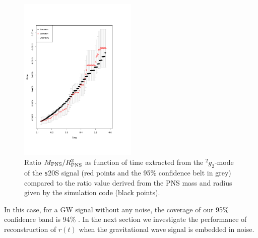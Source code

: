\begin{figure}
 \centering
 \includegraphics[width=0.5\textwidth,height=0.3\textheight]{plots/ratio}
 \caption{Ratio $M_{\rm PNS}/R_{\rm PNS}^2$ as function of time extracted from the $\mbox{}^2 g_2$-mode of the {\texttt s20S} signal (red points and the 95\% confidence belt in grey) compared to the ratio value derived from the PNS mass and radius given by the simulation code (black points).} \label{fig:ratio}
\end{figure}


In this case, for a GW signal without any noise, the coverage of our 95\% confidence band is 94\% .
In the next section we investigate the performance of  reconstruction of $r(t)$ when the gravitational wave
signal is embedded in noise.
